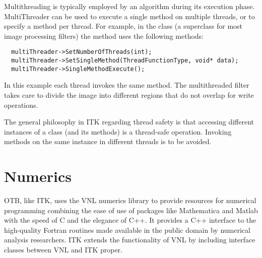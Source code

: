 Multithreading is typically employed by an algorithm during its execution
phase. MultiThreader can be used to execute a single method on
multiple threads, or to specify a method per thread. For example, in the 
class  (a superclass for most image processing filters)
the  method uses the following methods:

\small
\begin{verbatim}
  multiThreader->SetNumberOfThreads(int);
  multiThreader->SetSingleMethod(ThreadFunctionType, void* data);
  multiThreader->SingleMethodExecute();
\end{verbatim}
\normalsize

In this example each thread invokes the same method. The multithreaded filter
takes care to divide the image into different regions that do not overlap for
write operations.

The general philosophy in ITK regarding thread safety is that accessing
different instances of a class (and its methods) is a thread-safe operation.
Invoking methods on the same instance in different threads is to be avoided.


\section{Numerics}
\label{sec:Numerics}


OTB, like ITK, uses the VNL numerics library to provide resources for numerical
programming combining the ease of use of packages like Mathematica and Matlab
with the speed of C and the elegance of C++. It provides a C++ interface to
the high-quality Fortran routines made available in the public domain by
numerical analysis researchers. ITK extends the functionality of VNL
by including interface classes between VNL and ITK proper.


